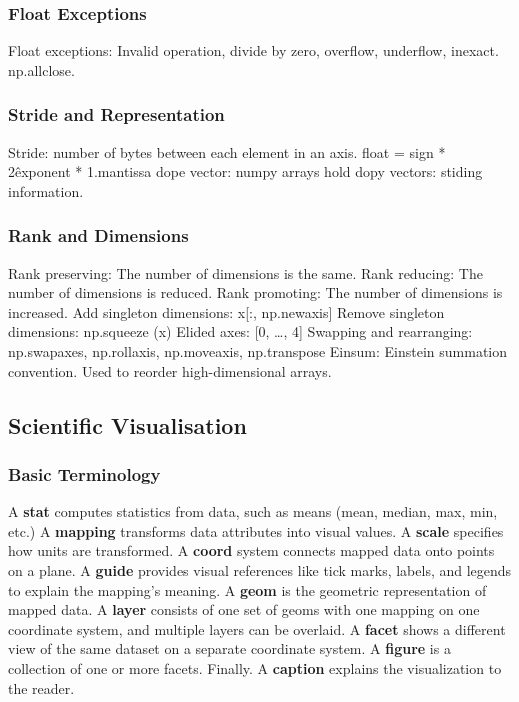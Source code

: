 \documentclass{article}
\begin{document}
\subsubsection*{Float Exceptions}
Float exceptions:  
Invalid operation, divide by zero, overflow, underflow, inexact.  
np.allclose.  

\subsubsection*{Stride and Representation}
Stride: number of bytes between each element in an axis.  
float = sign * 2\^{exponent} * 1.mantissa  
dope vector:  
numpy arrays hold dopy vectors: stiding information.  

\subsubsection*{Rank and Dimensions}
Rank preserving: The number of dimensions is the same.  
Rank reducing: The number of dimensions is reduced.  
Rank promoting: The number of dimensions is increased.  
Add singleton dimensions: x[:, np.newaxis]  
Remove singleton dimensions: np.squeeze (x)  
Elided axes: [0, \ldots, 4]  
Swapping and rearranging: np.swapaxes, np.rollaxis, np.moveaxis, np.transpose  
Einsum: Einstein summation convention. Used to reorder high-dimensional arrays.

\subsection*{Scientific Visualisation}

\subsubsection*{Basic Terminology}
A \textbf{stat} computes statistics from data, such as means (mean, median, max, min,  etc.)  
A \textbf{mapping} transforms data attributes into visual values.  
A \textbf{scale} specifies how units are transformed.  
A \textbf{coord} system connects mapped data onto points on a plane.  
A \textbf{guide} provides visual references like tick marks, labels, and legends to explain the mapping's meaning.  
A \textbf{geom} is the geometric representation of mapped data.  
A \textbf{layer} consists of one set of geoms with one mapping on one coordinate system, and multiple layers can be overlaid.  
A \textbf{facet} shows a different view of the same dataset on a separate coordinate system.  
A \textbf{figure} is a collection of one or more facets. Finally.  
A \textbf{caption} explains the visualization to the reader.
\end{document}
